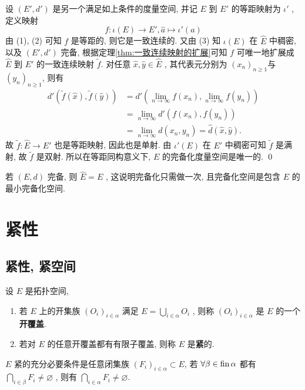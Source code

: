 \begin{Proof}
		设 $ (E', d') $ 是另一个满足如上条件的度量空间, 并记 $ E $ 到 $ E' $ 的等距映射为 $ \iota' $ , 定义映射
		\[
			 f: \iota(E)  \to E', \hat{a} \mapsto \iota'(a)
		\]
		由 (1), (2) 可知 $ f $ 是等距的, 则它是一致连续的. 又由 (3) 知 $ \iota(E) $ 在 $ \widehat{E} $ 中稠密, 以及 $ (E', d') $ 完备, 根据定理\ref{thm:一致连续映射的扩展}可知 $ f $ 可唯一地扩展成 $ \widehat{E} $ 到 $ E' $ 的一致连续映射 $ \tilde{f} $. 对任意 $ \hat{x}, \hat{y}\in \widehat{E} $ , 其代表元分别为 $ (x_{n})_{n\geqslant1} $与 $ (y_{n})_{n\geqslant1} $, 则有
		\[
			\begin{aligned}
				d'(\tilde{f}(\hat{x}), \tilde{f}(\hat{y})) & = d'(\lim_{n\to\infty}f(x_{n}), \lim_{n\to\infty}f(y_{n}))\\
				& = \lim_{n\to\infty} d'(f(x_{n}), f(y_{n}))\\
				& = \lim_{n\to\infty} d(x_{n}, y_{n})=\hat{d}(\hat{x}, \hat{y}).
			\end{aligned}
		\]
		故 $ \tilde{f}:\widehat{E}\to E' $ 也是等距映射, 因此也是单射. 由 $ \iota'(E) $ 在 $ E' $ 中稠密可知 $ \tilde{f} $ 是满射, 故 $ \tilde{f} $ 是双射. 所以在等距同构意义下, $ E $ 的完备化度量空间是唯一的. \qed
	\end{Proof}

	\begin{Remark}
		若 $ (E, d) $ 完备, 则 $ \widehat{E}=E $ , 这说明完备化只需做一次, 且完备化空间是包含 $ E $ 的最小完备化空间.
	\end{Remark}

\section{紧性}
	\subsection{紧性, 紧空间}
	\begin{Definition}[紧性]\label{def:紧性}
		 设 $ E $ 是拓扑空间,
		 \begin{enumerate}[(1)]
			 \item 若 $ E $ 上的开集族 $ (O_{i})_{i\in \alpha} $ 满足 $ E=\bigcup_{i\in\alpha}O_{i} $ , 则称 $ (O_{i})_{i\in\alpha} $ 是 $ E $ 的一个\textbf{开覆盖}.
			 \item 若对 $ E $ 的任意开覆盖都有有限子覆盖, 则称 $ E $ 是\textbf{紧}的.
		 \end{enumerate}
	\end{Definition}

	\begin{Proposition}\label{prop:紧性的另一刻画}
		 $ E $ 紧的充分必要条件是任意闭集族 $ (F_{i})_{i\in\alpha}\subset E $, 若 $ \forall \beta\in\operatorname{fin}\alpha $ 都有 $ \bigcap_{i\in\beta}F_{i}\neq \varnothing $ , 则有 $ \bigcap_{i\in\alpha}F_{i}\neq\varnothing $.
	\end{Proposition}

